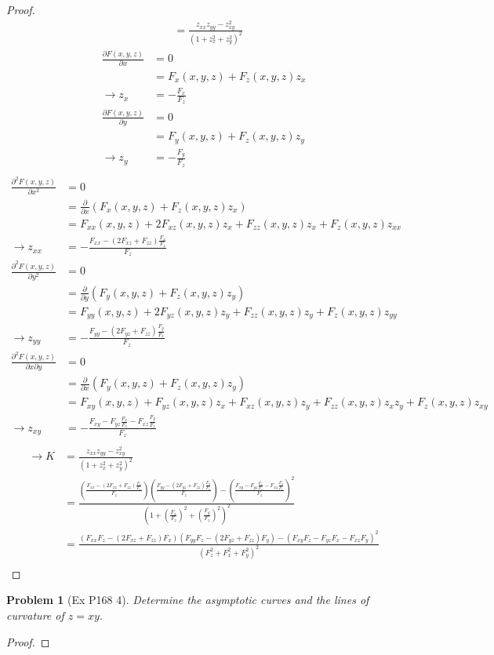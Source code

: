 \documentclass[10pt,a4paper]{article}
\newcounter{theProblemCounter}
\newtheorem{problem}[theProblemCounter]{Problem}
\begin{document}
\begin{proof}
\begin{align*}
&=\frac{z_{xx}z_{yy}-z_{xy}^2}{(1+z_x^2+z_y^2)^2}
\end{align*}
\begin{align*}
\frac{\partial F(x,y,z)}{\partial x}&=0\\
&=F_x(x,y,z)+F_z(x,y,z)z_x\\
\rightarrow z_x&=-\frac{F_x}{F_z}\\
\frac{\partial F(x,y,z)}{\partial y}&=0\\
&=F_y(x,y,z)+F_z(x,y,z)z_y\\
\rightarrow z_y&=-\frac{F_y}{F_z}\\
\end{align*}
\begin{align*}
\frac{\partial^2 F(x,y,z)}{\partial x^2}&=0\\
&=\frac{\partial}{\partial x}(F_x(x,y,z)+F_z(x,y,z)z_x)\\
&=F_{xx}(x,y,z)+2F_{xz}(x,y,z)z_x+F_{zz}(x,y,z)z_x+F_z(x,y,z)z_{xx}\\
\rightarrow z_{xx}&=-\frac{F_{xx}-(2F_{xz}+F_{zz})\frac{F_x}{F_z}}{F_z}\\
\frac{\partial^2 F(x,y,z)}{\partial y^2}&=0\\
&=\frac{\partial}{\partial y}(F_y(x,y,z)+F_z(x,y,z)z_y)\\
&=F_{yy}(x,y,z)+2F_{yz}(x,y,z)z_y+F_{zz}(x,y,z)z_y+F_z(x,y,z)z_{yy}\\
\rightarrow z_{yy}&=-\frac{F_{yy}-(2F_{yz}+F_{zz})\frac{F_y}{F_z}}{F_z}\\
\frac{\partial^2 F(x,y,z)}{\partial x\partial y}&=0\\
&=\frac{\partial}{\partial x}(F_y(x,y,z)+F_z(x,y,z)z_y)\\
&=F_{xy}(x,y,z)+F_{yz}(x,y,z)z_x+F_{xz}(x,y,z)z_y+F_{zz}(x,y,z)z_xz_y+F_z(x,y,z)z_{xy}\\
\rightarrow z_{xy}&=-\frac{F_{xy}-F_{yz}\frac{F_x}{F_z}-F_{xz}\frac{F_y}{F_z}}{F_z}\\
\end{align*}
\begin{align*}
\rightarrow K&=\frac{z_{xx}z_{yy}-z_{xy}^2}{(1+z_x^2+z_y^2)^2}\\
&=\frac{\left(\frac{F_{xx}-(2F_{xz}+F_{zz})\frac{F_x}{F_z}}{F_z}\right)\left(\frac{F_{yy}-(2F_{yz}+F_{zz})\frac{F_y}{F_z}}{F_z}\right)-\left(\frac{F_{xy}-F_{yz}\frac{F_x}{F_z}-F_{xz}\frac{F_y}{F_z}}{F_z}\right)^2}{(1+\left(\frac{F_x}{F_z}\right)^2+\left(\frac{F_y}{F_z}\right)^2)^2}\\
&=\frac{\left(F_{xx}F_z-(2F_{xz}+F_{zz})F_x\right)\left(F_{yy}F_z-(2F_{yz}+F_{zz})F_y\right)-\left(F_{xy}F_z-F_{yz}F_x-F_{xz}F_y\right)^2}{(F_z^2+F_x^2+F_y^2)^2}\\
\end{align*}
\end{proof}
\setcounter{theProblemCounter}{2}
\begin{problem}[Ex P168 4]
Determine the asymptotic curves and the lines of curvature of $z=xy$.
\end{problem}
\begin{proof}
\end{proof}
\end{document}
